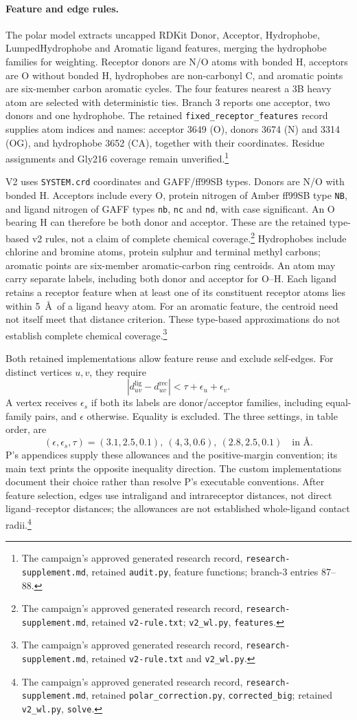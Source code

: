\documentclass{article}
\newcommand{\rr}[1]{\footnote{The campaign's approved generated research record, \texttt{research-supplement.md}, #1.}}
\begin{document}
\paragraph{Feature and edge rules.}
The polar model extracts uncapped RDKit Donor, Acceptor, Hydrophobe, LumpedHydrophobe and Aromatic ligand features, merging the hydrophobe families for weighting. Receptor donors are N/O atoms with bonded H, acceptors are O without bonded H, hydrophobes are non-carbonyl C, and aromatic points are six-member carbon aromatic cycles. The four features nearest a 3B heavy atom are selected with deterministic ties. Branch 3 reports one acceptor, two donors and one hydrophobe. The retained \texttt{fixed\_receptor\_features} record supplies atom indices and names: acceptor 3649 (O), donors 3674 (N) and 3314 (OG), and hydrophobe 3652 (CA), together with their coordinates. Residue assignments and Gly216 coverage remain unverified.\rr{retained \texttt{audit.py}, feature functions; branch-3 entries 87--88}

V2 uses \texttt{SYSTEM.crd} coordinates and GAFF/ff99SB types. Donors are N/O with bonded H. Acceptors include every O, protein nitrogen of Amber ff99SB type \texttt{NB}, and ligand nitrogen of GAFF types \texttt{nb}, \texttt{nc} and \texttt{nd}, with case significant. An O bearing H can therefore be both donor and acceptor. These are the retained type-based v2 rules, not a claim of complete chemical coverage.\rr{retained \texttt{v2-rule.txt}; \texttt{v2\_wl.py}, \texttt{features}} Hydrophobes include chlorine and bromine atoms, protein sulphur and terminal methyl carbons; aromatic points are six-member aromatic-carbon ring centroids. An atom may carry separate labels, including both donor and acceptor for O--H. Each ligand retains a receptor feature when at least one of its constituent receptor atoms lies within 5~\AA\ of a ligand heavy atom. For an aromatic feature, the centroid need not itself meet that distance criterion. These type-based approximations do not establish complete chemical coverage.\rr{retained \texttt{v2-rule.txt} and \texttt{v2\_wl.py}}

Both retained implementations allow feature reuse and exclude self-edges. For distinct vertices \(u,v\), they require
\[
 |d^{\mathrm{lig}}_{uv}-d^{\mathrm{rec}}_{uv}|
 <\tau+\epsilon_u+\epsilon_v.
\]
A vertex receives \(\epsilon_s\) if both its labels are donor/acceptor families, including equal-family pairs, and \(\epsilon\) otherwise. Equality is excluded. The three settings, in table order, are
\[
 (\epsilon,\epsilon_s,\tau)
 =(3.1,2.5,0.1),\ (4,3,0.6),\ (2.8,2.5,0.1)
 \quad\text{in \AA}.
\]
P's appendices supply these allowances and the positive-margin convention; its main text prints the opposite inequality direction. The custom implementations document their choice rather than resolve P's executable conventions. After feature selection, edges use intraligand and intrareceptor distances, not direct ligand--receptor distances; the allowances are not established whole-ligand contact radii.\cite{P}\rr{retained \texttt{polar\_correction.py}, \texttt{corrected\_big}; retained \texttt{v2\_wl.py}, \texttt{solve}}
\end{document}
